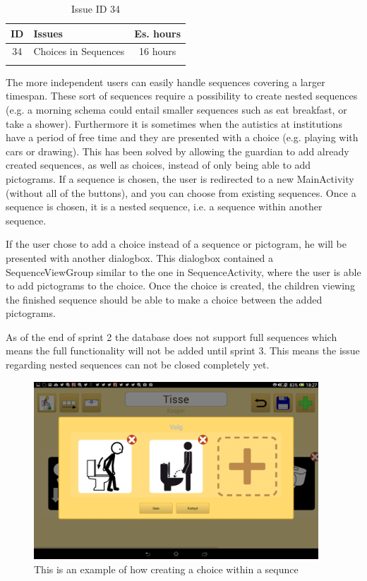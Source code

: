 \begin{longtable} { | c | p{12cm} | c | } 
\hline
	ID 	&	Issues	&		 Es. hours \\\hline
	34 	&	Choices in Sequences		&	16 hours \\\hline
\caption{Issue ID 34}
\label{tab:spr2_nested}
\end{longtable}

The more independent users can easily handle sequences covering a larger timespan. These sort of sequences require a possibility to create nested sequences (e.g. a morning schema could entail smaller sequences such as eat breakfast, or take a shower). Furthermore it is sometimes when the autistics at institutions have a period of free time and they are presented with a choice (e.g. playing with cars or drawing).
This has been solved by allowing the guardian to add already created sequences, as well as choices, instead of only being able to add pictograms. If a sequence is chosen, the user is redirected to a new MainActivity (without all of the buttons), and you can choose from existing sequences. Once a sequence is chosen, it is a nested sequence, i.e. a sequence within another sequence. 

If the user chose to add a choice instead of a sequence or pictogram, he will be presented with another dialogbox. This dialogbox contained a SequenceViewGroup similar to the one in SequenceActivity, where the user is able to add pictograms to the choice. Once the choice is created, the children viewing the finished sequence should be able to make a choice between the added pictograms.

As of the end of sprint 2 the database does not support full sequences which means the full functionality will not be added until sprint 3. This means the issue regarding nested sequences can not be closed completely yet.

\begin{figure} [h!]
\centering
\includegraphics[width=0.95\textwidth]{Pics/Sprint2/choices/choiceDialog.png}
\caption{This is an example of how creating a choice within a sequnce}
\label{fig:Old_editName}
\end{figure}




